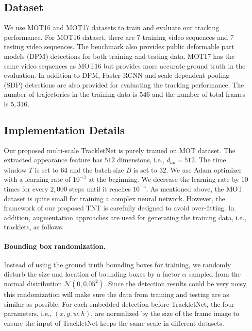 \documentclass[10pt,twocolumn,letterpaper]{article}
\begin{document}
\subsection{Dataset}
\label{sec:dataset}
We use MOT16 and MOT17 \cite{milan2016mot16} datasets to train and evaluate our tracking performance. For MOT16 dataset, there are $7$ training video sequences and $7$ testing video sequences. The benchmark also provides public deformable part models (DPM) \cite{felzenszwalb2010object} detections for both training and testing data. MOT17 has the same video sequences 
as MOT16 but provides more accurate ground truth in the evaluation. In addition to DPM, Faster-RCNN \cite{ren2015faster} and scale dependent pooling (SDP) \cite{yang2016exploit} detections are also provided for evaluating the tracking performance. The number of trajectories in the training data is $546$ and the number of total frames is $5,316$.

\subsection{Implementation Details}



Our proposed multi-scale TrackletNet is purely trained on MOT dataset. The extracted appearance feature has $512$ dimensions, i.e., $d_{ap}=512$. The time window $T$ is set to $64$ and the batch size $B$ is set to $32$. We use Adam optimizer with a learning rate of $10^{-3}$ at the beginning. We decrease the learning rate by $10$ times for every $2,000$ steps until it reaches $10^{-5}$. As mentioned above, the MOT dataset is quite small for training a complex neural network. However, the framework of our proposed TNT is carefully designed to avoid over-fitting. In addition, augmentation approaches are used for generating the training data, i.e., tracklets, as follows. 



\paragraph{Bounding box randomization.} Instead of using the ground truth bounding boxes for training, we randomly disturb the size and location of bounding boxes 
by a factor $\alpha$ sampled from the normal distribution $\mathcal{N}(0,0.05^2)$. Since the detection results could be very noisy, this randomization will make sure the data from training and testing are as similar as possible. For each embedded detection before TrackletNet, the four parameters, i.e., $(x,y,w,h)$, are normalized by the size of the frame image to ensure the input of TrackletNet keeps the same scale in different datasets.
\end{document}
